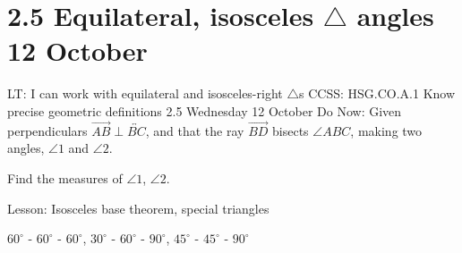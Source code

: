 \documentclass[onlytextwidth]{beamer}
\begin{document}
\section{2.5 Equilateral, isosceles $\triangle$ angles \hfill 12 October}
\begin{frame}{LT: I can work with equilateral and isosceles-right $\triangle$s}
  {CCSS: HSG.CO.A.1 Know precise geometric definitions  \hfill \alert{2.5 Wednesday 12 October}}
  Do Now: Given perpendiculars $\overrightarrow{AB} \perp \overleftrightarrow{BC}$, and that the ray $\overrightarrow{BD}$ bisects $\angle ABC$, making two angles, $\angle 1$ and $\angle 2$. \par \medskip
  Find the measures of $\angle 1$, $\angle 2$.
  \begin{flushleft}
    \end{flushleft}
    Lesson: Isosceles base theorem, special triangles \par $60^\circ$ - $60^\circ$ - $60^\circ$, $30^\circ$ - $60^\circ$ - $90^\circ$, $45^\circ$ - $45^\circ$ - $90^\circ$
  \end{frame}
\end{document}
